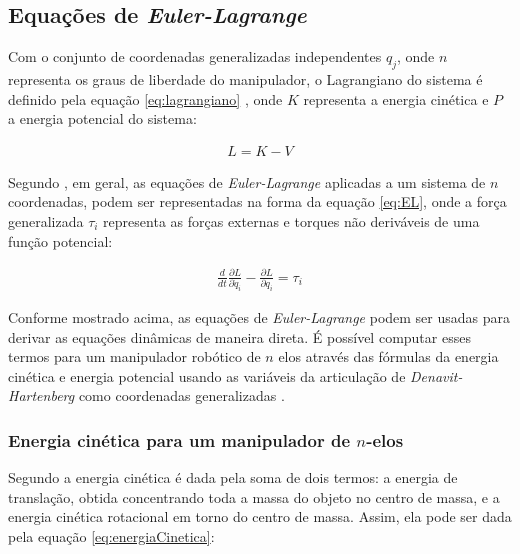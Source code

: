 \subsection{Equações de \textit{Euler-Lagrange}}
\label{EL}

Com o conjunto de coordenadas generalizadas independentes $q_j$, onde $n$ 
representa os graus de liberdade do manipulador, o Lagrangiano do sistema 
é definido pela equação \ref{eq:lagrangiano} \cite{Spong}, onde $K$ representa 
a energia cinética e $P$ a energia potencial do sistema:

\begin{equation}
  \begin{gathered}
    L = K - V
  \end{gathered}
  \label{eq:lagrangiano}
\end{equation}

Segundo , em geral, as equações de \textit{Euler-Lagrange}
aplicadas a um sistema de $n$ coordenadas, podem ser representadas na forma da
equação \ref{eq:EL}, onde a força generalizada $\tau_i$ representa as forças 
externas e torques não deriváveis de uma função potencial:

\begin{equation}
  \begin{gathered}
    \frac{d}{dt}\frac{\partial L}{\partial \dot q_i}-\frac{\partial L}{\partial q_i} = \tau_i
  \end{gathered}
  \label{eq:EL}
\end{equation}

Conforme mostrado acima, as equações de \textit{Euler-Lagrange} podem ser 
usadas para derivar as equações dinâmicas de maneira direta. É possível computar 
esses termos para um manipulador robótico de $n$ elos através das fórmulas da 
energia cinética e energia potencial usando as variáveis da articulação 
de \textit{Denavit-Hartenberg} como coordenadas generalizadas \cite{Spong}.

\subsubsection{Energia cinética para um manipulador de $n$-elos}

Segundo  a energia cinética é dada pela soma de dois 
termos: a energia de translação, obtida concentrando toda a massa do objeto no 
centro de massa, e a energia cinética rotacional em torno do centro de massa. 
Assim, ela pode ser dada pela equação \ref{eq:energiaCinetica}:

